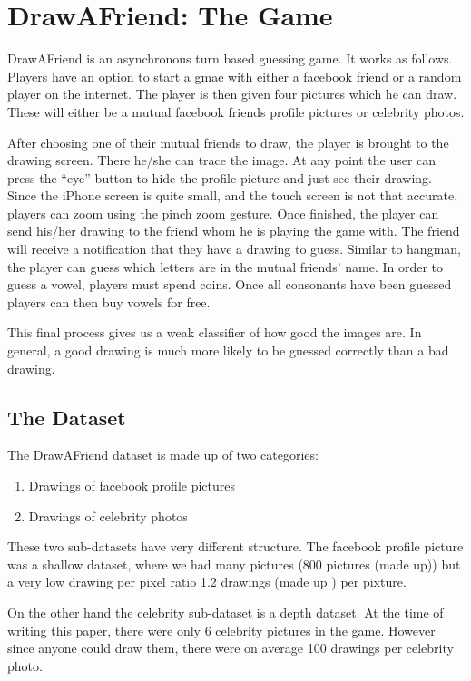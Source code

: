 \section{DrawAFriend: The Game}

DrawAFriend is an asynchronous turn based guessing game. It works as follows. Players have an option to start a gmae with either a facebook friend or a random player on the internet. The player is then given four pictures which he can draw. These will either be a mutual facebook friends profile pictures or celebrity photos.

After choosing one of their mutual friends to draw, the player is brought to the drawing screen. There he/she can trace the image. At any point the user can press the “eye” button to hide the profile picture and just see their drawing.  Since the iPhone screen is quite small, and the touch screen is not that accurate, players can zoom using the pinch zoom gesture. 
Once finished, the player can send his/her drawing to the friend whom he is playing the game with. The friend will receive a notification that they have a drawing to guess. Similar to hangman, the player can guess which letters are in the mutual friends’ name. In order to guess a vowel, players must spend coins. Once all consonants have been guessed players can then buy vowels for free. 

This final process gives us a weak classifier of how good the images are. In general, a good drawing is much more likely to be guessed correctly than a bad drawing.

\subsection{The Dataset}
The DrawAFriend dataset is made up of two categories:
\begin{enumerate}
\item Drawings of facebook profile pictures
\item Drawings of celebrity photos
\end{enumerate}

These two sub-datasets have very different structure. The facebook profile picture was a shallow dataset, where we had many pictures (800 pictures (made up)) but a very low drawing per pixel ratio 1.2 drawings (made up ) per pixture. 

On the other hand the celebrity sub-dataset is a depth dataset. At the time of writing this paper, there were only 6 celebrity pictures in the game. However since anyone could draw them, there were on average 100 drawings per celebrity photo.

